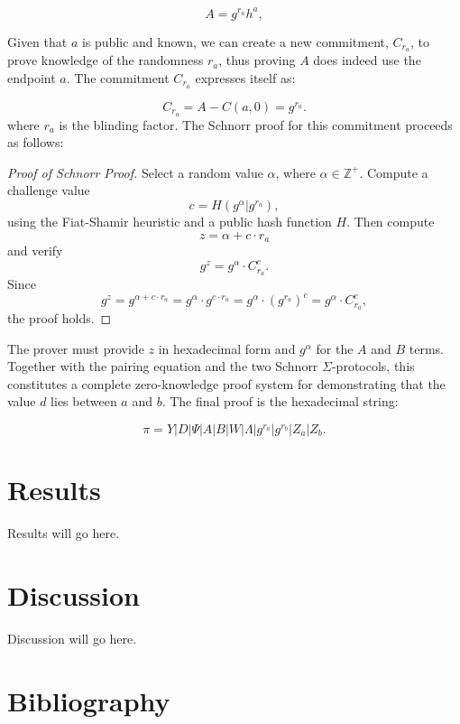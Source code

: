 \documentclass[version=preprint]{iacrcc}
\begin{document}
\begin{equation}
A = g^{r_{a}} h^{a},
\end{equation}

Given that \( a \) is public and known, we can create a new commitment, \( C_{r_a} \), to prove knowledge of the randomness \( r_a \), thus proving $A$ does indeed use the endpoint \(a\). The commitment \( C_{r_a} \) expresses itself as:

\begin{equation}
C_{r_a} = A - C(a, 0) = g^{r_{a}}.
\end{equation}
where \( r_{a} \) is the blinding factor. The Schnorr proof for this commitment proceeds as follows:

\begin{proof}[Proof of Schnorr Proof]
Select a random value \( \alpha \), where \( \alpha \in \mathbb{Z}^+ \). Compute a challenge value
\begin{equation}
c = H(g^{\alpha} | g^{r_{a}}), 
\end{equation}
using the Fiat-Shamir heuristic and a public hash function \( H \). Then compute 
\begin{equation}
z = \alpha + c \cdot r_{a}
\end{equation}
and verify
\begin{equation}
g^{z} = g^{\alpha} \cdot C_{r_a}^{c}.
\end{equation}
Since 
\begin{equation}
g^{z} = g^{\alpha + c \cdot r_{a}} = g^{\alpha} \cdot g^{c \cdot r_{a}} = g^{\alpha} \cdot (g^{r_{a}})^{c} = g^{\alpha} \cdot C_{r_a}^{c},
\end{equation}
the proof holds.
\end{proof}

The prover must provide \( z \) in hexadecimal form and \( g^{\alpha} \) for the \( A \) and \( B \) terms. Together with the pairing equation and the two Schnorr $\Sigma$-protocols, this constitutes a complete zero-knowledge proof system for demonstrating that the value \( d \) lies between \( a \) and \( b \). The final proof is the hexadecimal string:

\begin{equation}
\pi = Y | D | \Psi | A | B | W | \Lambda | g^{r_{a}} | g^{r_{b}} | Z_{a} | Z_{b}.
\end{equation}

\section{Results}

Results will go here.


\section{Discussion}

Discussion will go here.

\section{Bibliography}

\end{document}
